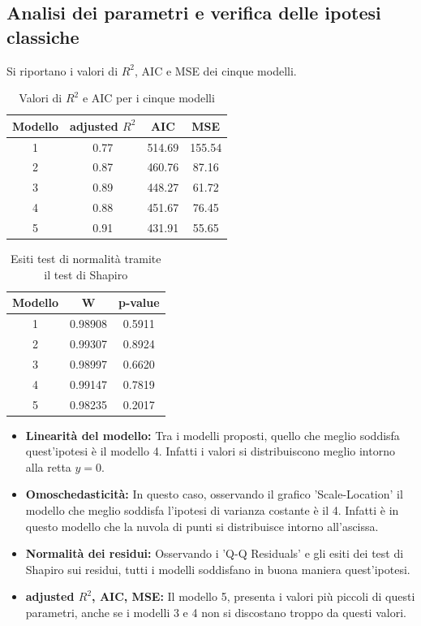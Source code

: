 \subsection{Analisi dei parametri e verifica delle ipotesi classiche}
Si riportano i valori di $R^2$, AIC e MSE dei cinque modelli.
\begin{table}[H]
	\centering
	\begin{tabular}{|c|c|c|c|}
		\hline
		\textbf{Modello} & \textbf{adjusted} \boldmath$R^2$ & \textbf{AIC} & \textbf{MSE}\\
		\hline
		1 &  0.77  & 514.69 & 155.54\\
		2 & 0.87 & 460.76 & 87.16\\
		3 & 0.89 & 448.27 & 61.72\\
		4 & 0.88 & 451.67 & 76.45\\
		5 & 0.91 & 431.91 & 55.65 \\
		\hline
	\end{tabular}
	\caption{Valori di $R^2$ e AIC per i cinque modelli}
\end{table}
\begin{table}[H]
	\centering
	\begin{tabular}{|c|c|c|}
		\hline
		\textbf{Modello} & \textbf{W} & \textbf{p-value} \\
		\hline
		1 & 0.98908 & 0.5911 \\
		2 & 0.99307 & 0.8924 \\
		3 & 0.98997 & 0.6620 \\
		4 & 0.99147 & 0.7819 \\
		5 & 0.98235 & 0.2017 \\
		\hline
	\end{tabular}
	\caption{Esiti test di normalità tramite il test di Shapiro}
	\label{tab:coef_estimates}
\end{table}
\begin{itemize}
	\item \textbf{Linearità del modello:} Tra i modelli proposti, quello che meglio soddisfa quest'ipotesi è il modello 4. Infatti i valori si distribuiscono meglio intorno alla retta $y=0$.
	\item \textbf{Omoschedasticità:} In questo caso, osservando il grafico 'Scale-Location' il modello che meglio soddisfa l'ipotesi di varianza costante è il 4. Infatti è in questo modello che la nuvola di punti si distribuisce intorno all'ascissa.
	\item \textbf{Normalità dei residui: } Osservando i 'Q-Q Residuals' e gli esiti dei test di Shapiro sui residui, tutti i modelli soddisfano in buona maniera quest'ipotesi.
	\item \textbf{adjusted $R^2$, AIC, MSE:} Il modello 5, presenta i valori più piccoli di questi parametri, anche se i modelli 3 e 4 non si discostano troppo da questi valori. 
\end{itemize}
